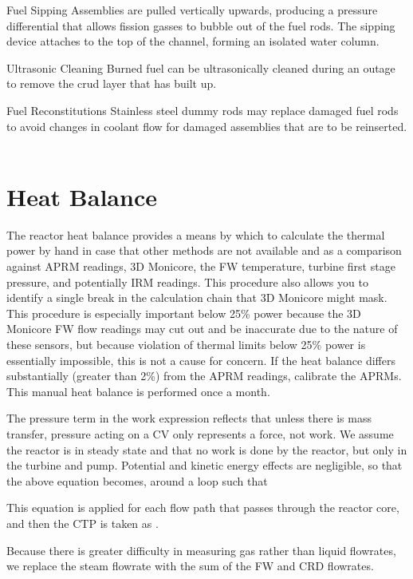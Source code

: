 \documentclass[10pt]{article}
\begin{document}
Fuel Sipping
Assemblies are pulled vertically upwards, producing a pressure differential that allows fission gasses to bubble out of the fuel rods. The sipping device attaches to the top of the channel, forming an isolated water column. 

Ultrasonic Cleaning
Burned fuel can be ultrasonically cleaned during an outage to remove the crud layer that has built up. 

Fuel Reconstitutions
Stainless steel dummy rods may replace damaged fuel rods to avoid changes in coolant flow for damaged assemblies that are to be reinserted. 
\section{Heat Balance}

The reactor heat balance provides a means by which to calculate the thermal power by hand in case that other methods are not available and as a comparison against APRM readings, 3D Monicore, the FW temperature, turbine first stage pressure, and potentially IRM readings. This procedure also allows you to identify a single break in the calculation chain that 3D Monicore might mask. This procedure is especially important below 25\% power because the 3D Monicore FW flow readings may cut out and be inaccurate due to the nature of these sensors, but because violation of thermal limits below 25\% power is essentially impossible, this is not a cause for concern. If the heat balance differs substantially (greater than 2\%) from the APRM readings, calibrate the APRMs. This manual heat balance is performed once a month. 







The pressure term in the work expression reflects that unless there is mass transfer, pressure acting on a CV only represents a force, not work. We assume the reactor is in steady state and that no work is done by the reactor, but only in the turbine and pump. Potential and kinetic energy effects are negligible, so that the above equation becomes, around a loop such that 


This equation is applied for each flow path that passes through the reactor core, and then the CTP is taken as . 







Because there is greater difficulty in measuring gas rather than liquid flowrates, we replace the steam flowrate with the sum of the FW and CRD flowrates. 
\end{document}

